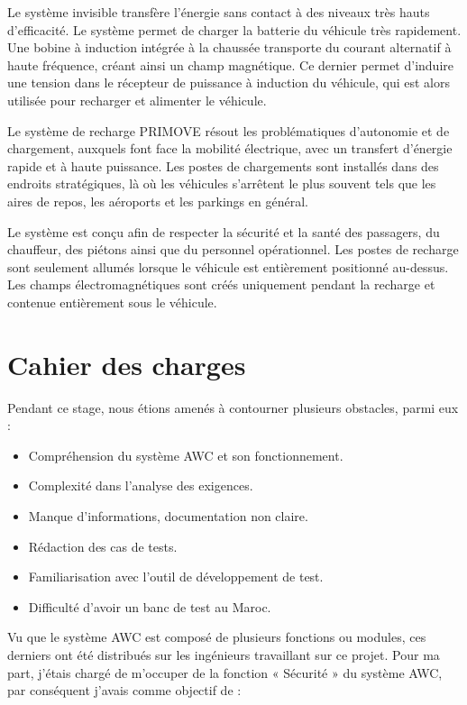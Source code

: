 Le système invisible transfère l’énergie sans contact à des niveaux très hauts d’efficacité. Le système permet de charger la batterie du véhicule très rapidement. Une bobine à induction intégrée à la chaussée transporte du courant alternatif à haute fréquence, créant ainsi un champ magnétique. Ce dernier permet d’induire une tension dans le récepteur de puissance à induction du véhicule, qui est alors utilisée pour recharger et alimenter le véhicule.

Le système de recharge PRIMOVE résout les problématiques d’autonomie et de chargement, auxquels font face la mobilité électrique, avec un transfert d’énergie rapide et à haute puissance. Les postes de chargements sont installés dans des endroits stratégiques, là où les véhicules s’arrêtent le plus souvent tels que les aires de repos, les aéroports et les parkings en général.

Le système est conçu afin de respecter la sécurité et la santé des passagers, du chauffeur, des piétons ainsi que du personnel opérationnel. Les postes de recharge sont seulement allumés lorsque le véhicule est entièrement positionné au-dessus. Les champs électromagnétiques sont créés uniquement pendant la recharge et contenue entièrement sous le véhicule.

\section{Cahier des charges}

\noindent Pendant ce stage, nous étions amenés à contourner plusieurs obstacles, parmi eux : 

\begin{itemize}
	\item Compréhension du système AWC et son fonctionnement.
	\item Complexité dans l’analyse des exigences.
	\item Manque d’informations, documentation non claire.
	\item Rédaction des cas de tests.
	\item Familiarisation avec l’outil de développement de test.
	\item Difficulté d’avoir un banc de test au Maroc.
\end{itemize}


Vu que le système AWC est composé de plusieurs fonctions ou modules, ces derniers ont été distribués sur les ingénieurs travaillant sur ce projet. Pour ma part, j’étais chargé de m’occuper de la fonction « Sécurité » du système AWC, par conséquent j’avais comme objectif de : 


